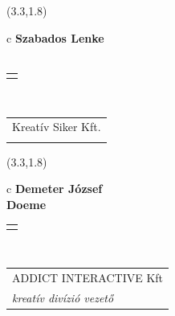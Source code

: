 \documentclass[11pt]{article}
\begin{document}
\makebox(3.3,1.8){
  \renewcommand\arraystretch{1.3}
  \begin{tabular}[c]{c}
    \hspace{8.5mm}
    \LARGE\bf{ Szabados Lenke }\\
    \hspace{8.5mm}
    \Large{  }\\
    \renewcommand\arraystretch{3}
    \begin{tabular}[c]{c}
      \centering
      \fontfamily{phv}\selectfont{
        \textbf{
          \textsc{
            \scriptsize{
            \color{Bright}{ Ismerkedő }\color{Dark}{ Webmester }\color{Bright}{ Sminkmester }\color{Bright}{ Programozó }
            }
          }
        }
      }
    \end{tabular}
    \\
    \renewcommand\arraystretch{1}
    \begin{tabular}{p{3.3in}}
      \hspace{.7cm}Kreatív Siker Kft.\\
      \hspace{.7cm}\emph{  }\\
    \end{tabular}
  \end{tabular}
}

\makebox(3.3,1.8){
  \renewcommand\arraystretch{1.3}
  \begin{tabular}[c]{c}
    \hspace{8.5mm}
    \LARGE\bf{ Demeter József }\\
    \hspace{8.5mm}
    \Large{ Doeme }\\
    \renewcommand\arraystretch{3}
    \begin{tabular}[c]{c}
      \centering
      \fontfamily{phv}\selectfont{
        \textbf{
          \textsc{
            \scriptsize{
            \color{Bright}{ Ismerkedő }\color{Dark}{ Webmester }\color{Dark}{ Sminkmester }\color{Bright}{ Programozó }
            }
          }
        }
      }
    \end{tabular}
    \\
    \renewcommand\arraystretch{1}
    \begin{tabular}{p{3.3in}}
      \hspace{.7cm}ADDICT INTERACTIVE Kft\\
      \hspace{.7cm}\emph{ kreatív divízió vezető }\\
    \end{tabular}
  \end{tabular}
}
\end{document}
